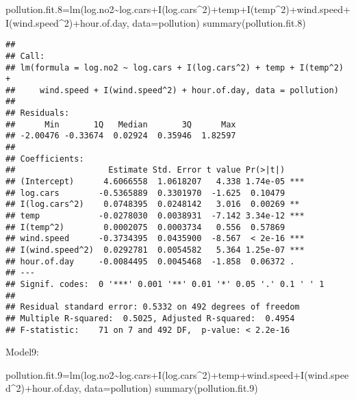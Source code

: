\documentclass[
]{article}
\newenvironment{Shaded}{\begin{snugshade}}{\end{snugshade}}
\newcommand{\AttributeTok}[1]{\textcolor[rgb]{0.77,0.63,0.00}{#1}}
\newcommand{\DecValTok}[1]{\textcolor[rgb]{0.00,0.00,0.81}{#1}}
\newcommand{\FloatTok}[1]{\textcolor[rgb]{0.00,0.00,0.81}{#1}}
\newcommand{\FunctionTok}[1]{\textcolor[rgb]{0.00,0.00,0.00}{#1}}
\newcommand{\NormalTok}[1]{#1}
\newcommand{\OtherTok}[1]{\textcolor[rgb]{0.56,0.35,0.01}{#1}}
\newcommand{\SpecialCharTok}[1]{\textcolor[rgb]{0.00,0.00,0.00}{#1}}
\begin{document}
\begin{Shaded}
\begin{Highlighting}[]
\NormalTok{pollution.fit}\FloatTok{.8}\OtherTok{=}\FunctionTok{lm}\NormalTok{(log.no2}\SpecialCharTok{\textasciitilde{}}\NormalTok{log.cars}\SpecialCharTok{+}\FunctionTok{I}\NormalTok{(log.cars}\SpecialCharTok{\^{}}\DecValTok{2}\NormalTok{)}\SpecialCharTok{+}\NormalTok{temp}\SpecialCharTok{+}\FunctionTok{I}\NormalTok{(temp}\SpecialCharTok{\^{}}\DecValTok{2}\NormalTok{)}\SpecialCharTok{+}\NormalTok{wind.speed}\SpecialCharTok{+}\FunctionTok{I}\NormalTok{(wind.speed}\SpecialCharTok{\^{}}\DecValTok{2}\NormalTok{)}\SpecialCharTok{+}\NormalTok{hour.of.day, }\AttributeTok{data=}\NormalTok{pollution)}
\FunctionTok{summary}\NormalTok{(pollution.fit}\FloatTok{.8}\NormalTok{)}
\end{Highlighting}
\end{Shaded}

\begin{verbatim}
## 
## Call:
## lm(formula = log.no2 ~ log.cars + I(log.cars^2) + temp + I(temp^2) + 
##     wind.speed + I(wind.speed^2) + hour.of.day, data = pollution)
## 
## Residuals:
##      Min       1Q   Median       3Q      Max 
## -2.00476 -0.33674  0.02924  0.35946  1.82597 
## 
## Coefficients:
##                   Estimate Std. Error t value Pr(>|t|)    
## (Intercept)      4.6066558  1.0618207   4.338 1.74e-05 ***
## log.cars        -0.5365889  0.3301970  -1.625  0.10479    
## I(log.cars^2)    0.0748395  0.0248142   3.016  0.00269 ** 
## temp            -0.0278030  0.0038931  -7.142 3.34e-12 ***
## I(temp^2)        0.0002075  0.0003734   0.556  0.57869    
## wind.speed      -0.3734395  0.0435900  -8.567  < 2e-16 ***
## I(wind.speed^2)  0.0292781  0.0054582   5.364 1.25e-07 ***
## hour.of.day     -0.0084495  0.0045468  -1.858  0.06372 .  
## ---
## Signif. codes:  0 '***' 0.001 '**' 0.01 '*' 0.05 '.' 0.1 ' ' 1
## 
## Residual standard error: 0.5332 on 492 degrees of freedom
## Multiple R-squared:  0.5025, Adjusted R-squared:  0.4954 
## F-statistic:    71 on 7 and 492 DF,  p-value: < 2.2e-16
\end{verbatim}

Model9:

\begin{Shaded}
\begin{Highlighting}[]
\NormalTok{pollution.fit}\FloatTok{.9}\OtherTok{=}\FunctionTok{lm}\NormalTok{(log.no2}\SpecialCharTok{\textasciitilde{}}\NormalTok{log.cars}\SpecialCharTok{+}\FunctionTok{I}\NormalTok{(log.cars}\SpecialCharTok{\^{}}\DecValTok{2}\NormalTok{)}\SpecialCharTok{+}\NormalTok{temp}\SpecialCharTok{+}\NormalTok{wind.speed}\SpecialCharTok{+}\FunctionTok{I}\NormalTok{(wind.speed}\SpecialCharTok{\^{}}\DecValTok{2}\NormalTok{)}\SpecialCharTok{+}\NormalTok{hour.of.day, }\AttributeTok{data=}\NormalTok{pollution)}
\FunctionTok{summary}\NormalTok{(pollution.fit}\FloatTok{.9}\NormalTok{)}
\end{Highlighting}
\end{Shaded}
\end{document}
